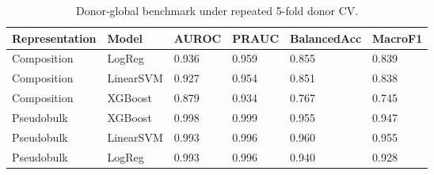 \begin{table}
\caption{Donor-global benchmark under repeated 5-fold donor CV.}
\begin{tabular}{llllll}
\toprule
Representation & Model & AUROC & PRAUC & BalancedAcc & MacroF1 \\
\midrule
Composition & LogReg & 0.936 & 0.959 & 0.855 & 0.839 \\
Composition & LinearSVM & 0.927 & 0.954 & 0.851 & 0.838 \\
Composition & XGBoost & 0.879 & 0.934 & 0.767 & 0.745 \\
Pseudobulk & XGBoost & 0.998 & 0.999 & 0.955 & 0.947 \\
Pseudobulk & LinearSVM & 0.993 & 0.996 & 0.960 & 0.955 \\
Pseudobulk & LogReg & 0.993 & 0.996 & 0.940 & 0.928 \\
\bottomrule
\end{tabular}
\end{table}
